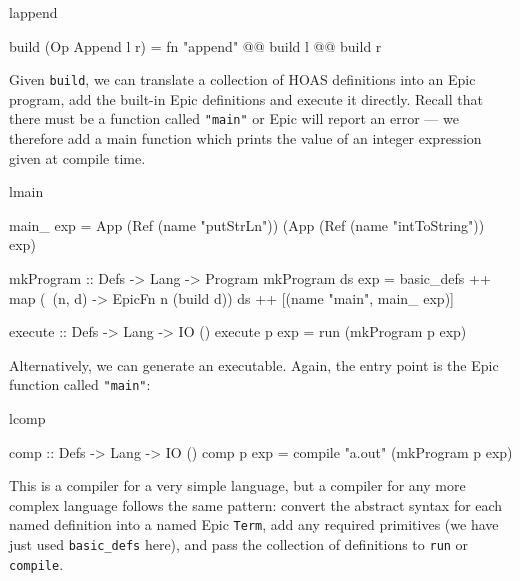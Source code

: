 \begin{SaveVerbatim}{lappend}

build (Op Append l r) = fn "append" @@ build l @@ build r

\end{SaveVerbatim}

\noindent
Given \texttt{build}, we can translate a collection of HOAS
definitions into an Epic program, add the built-in Epic definitions
and execute it directly. Recall that there must be a function called
\texttt{"main"} or Epic will report an error --- we therefore add a
main function which prints the value of an integer expression
given at compile time.

\begin{SaveVerbatim}{lmain}

main_ exp = App (Ref (name "putStrLn"))
                (App (Ref (name "intToString")) exp)

mkProgram :: Defs -> Lang -> Program
mkProgram ds exp = basic_defs ++ 
                   map (\ (n, d) -> EpicFn n (build d)) ds ++
                   [(name "main", main_ exp)]

execute :: Defs -> Lang -> IO ()
execute p exp = run (mkProgram p exp)

\end{SaveVerbatim}

\noindent
Alternatively, we can generate an executable. Again, the entry point
is the Epic function called \texttt{"main"}:

\begin{SaveVerbatim}{lcomp}

comp :: Defs -> Lang -> IO ()
comp p exp = compile "a.out" (mkProgram p exp)

\end{SaveVerbatim}

\noindent
This is a compiler for a very simple language, but a compiler for any
more complex language follows the same pattern: convert the abstract
syntax for each named definition into a named Epic \texttt{Term}, add
any required primitives (we have just used \texttt{basic\_defs} here),
and pass the collection of definitions to \texttt{run} or
\texttt{compile}. 



